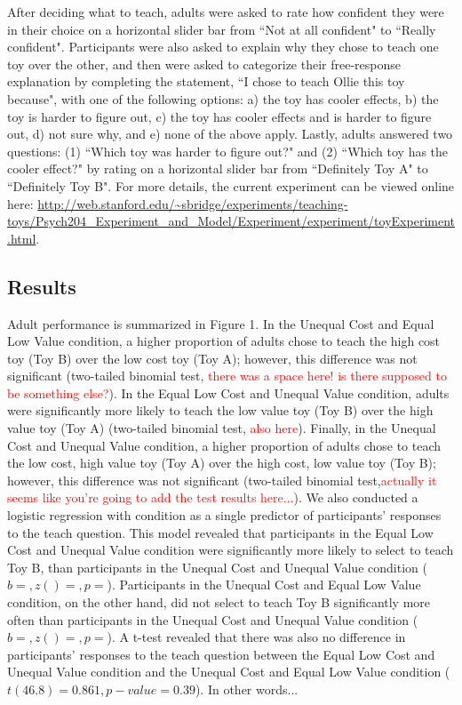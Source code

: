 \documentclass[10pt,letterpaper]{article}
\begin{document}
After deciding what to teach, adults were asked to rate how confident they were in their choice on a horizontal slider bar from ``Not at all confident" to ``Really confident". Participants were also asked to explain why they chose to teach one toy over the other, and then were asked to categorize their free-response explanation by completing the statement, ``I chose to teach Ollie this toy because", with one of the following options: a) the toy has cooler effects, b) the toy is harder to figure out, c) the toy has cooler effects and is harder to figure out, d) not sure why, and e) none of the above apply. Lastly, adults answered two questions: (1) ``Which toy was harder to figure out?" and (2) ``Which toy has the cooler effect?" by rating on a horizontal slider bar from ``Definitely Toy A" to ``Definitely Toy B". For more details, the current experiment can be viewed online here:  \url{http://web.stanford.edu/~sbridge/experiments/teaching-toys/Psych204_Experiment_and_Model/Experiment/experiment/toyExperiment.html}.

\subsection{Results}

Adult performance is summarized in Figure 1. In the Unequal Cost and Equal Low Value condition, a higher proportion of adults chose to teach the high cost toy (Toy B) over the low cost toy (Toy A); however, this difference was not significant (two-tailed binomial test, \textcolor{red}{there was a space here! is there supposed to be something else?}). In the Equal Low Cost and Unequal Value condition, adults were significantly more likely to teach the low value toy (Toy B) over the high value toy (Toy A) (two-tailed binomial test, \textcolor{red}{also here}). Finally, in the Unequal Cost and Unequal Value condition, a higher proportion of adults chose to teach the low cost, high value toy (Toy A) over the high cost, low value toy (Toy B); however, this difference was not significant (two-tailed binomial test,\textcolor{red}{actually it seems like you're going to add the test results here...}). We also conducted a logistic regression with condition as a single predictor of participants' responses to the teach question. This model revealed that participants in the Equal Low Cost and Unequal Value condition were significantly more likely to select to teach Toy B, than participants in the Unequal Cost and Unequal Value condition ($b = , z() = , p = $). Participants in the Unequal Cost and Equal Low Value condition, on the other hand, did not select to teach Toy B significantly more often than participants in the Unequal Cost and Unequal Value condition ($b = , z() = , p = $). A t-test revealed that there was also no difference in participants' responses to the teach question between the Equal Low Cost and Unequal Value condition and the Unequal Cost and Equal Low Value condition ($t(46.8) = 0.861,  p-value = 0.39$). In other words...
\end{document}
